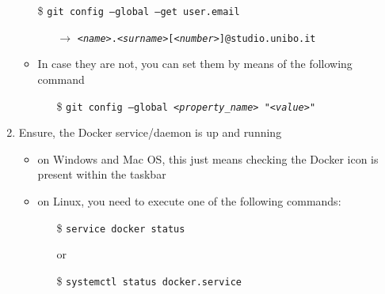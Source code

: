 \documentclass[handout]{beamer}\mode<presentation>{\usetheme{AMSCesenaBleu}}
\begin{document}
\begin{frame}[allowframebreaks]
\begin{enumerate}
\begin{itemize}
    	\item[\$] \texttt{git config --global --get user.\alert{email}}
    	\begin{itemize}	
    		\item[$\rightarrow$] \texttt{\textit{<name>}.\textit{<surname>}[\textit{<number>}]@\alert{studio.unibo.it}}    		
    	\end{itemize}
    
    	\vspace{.5cm}
    	
    	\item In case they are not, you can set them by means of the following command
    	\begin{itemize}	
    		\item[\$] \texttt{git config --global \texttt{\textit{<property\_name>}} \alert{"}\texttt{\textit{<value>}}\alert{"}}		
    	\end{itemize}
    \end{itemize}
    
    \framebreak
    
    \item Ensure, the Docker service/daemon is up and running
    \begin{itemize}
       	\item on Windows and Mac OS, this just means checking the Docker icon is present within the taskbar 
	
		\vspace{.3cm}
	
		\item on Linux, you need to execute one of the following commands:
		\begin{itemize}
			\item[\$] \texttt{service docker status}
			\item[] or
			\item[\$] \texttt{systemctl status docker.service}
		\end{itemize}
		

\end{itemize}
\end{enumerate}
\end{frame}
\end{document}
